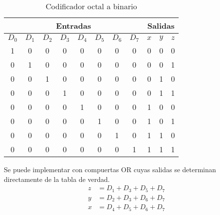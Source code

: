 \begin{table}[h]
    \centering
    \begin{tabular}{cccccccc|ccc}
        \toprule
        \multicolumn{8}{c}{Entradas} & \multicolumn{3}{c}{Salidas}                                                                   \\
        \midrule
        $D_0$                        & $D_1$                       & $D_2$ & $D_3$ & $D_4$ & $D_5$ & $D_6$ & $D_7$ & $x$ & $y$ & $z$ \\
        \midrule
        1                            & 0                           & 0     & 0     & 0     & 0     & 0     & 0     & 0   & 0   & 0   \\
        0                            & 1                           & 0     & 0     & 0     & 0     & 0     & 0     & 0   & 0   & 1   \\
        0                            & 0                           & 1     & 0     & 0     & 0     & 0     & 0     & 0   & 1   & 0   \\
        0                            & 0                           & 0     & 1     & 0     & 0     & 0     & 0     & 0   & 1   & 1   \\
        0                            & 0                           & 0     & 0     & 1     & 0     & 0     & 0     & 1   & 0   & 0   \\
        0                            & 0                           & 0     & 0     & 0     & 1     & 0     & 0     & 1   & 0   & 1   \\
        0                            & 0                           & 0     & 0     & 0     & 0     & 1     & 0     & 1   & 1   & 0   \\
        0                            & 0                           & 0     & 0     & 0     & 0     & 0     & 1     & 1   & 1   & 1   \\
        \bottomrule
    \end{tabular}
    \caption{Codificador octal a binario}
\end{table}

Se puede implementar con compuertas OR cuyas salidas se determinan directamente de la tabla de verdad.
\begin{align*}
    z & = D_1 + D_3 + D_5 + D_7 \\
    y & = D_2 + D_3 + D_6 + D_7 \\
    x & = D_4 + D_5 + D_6 + D_7
\end{align*}

